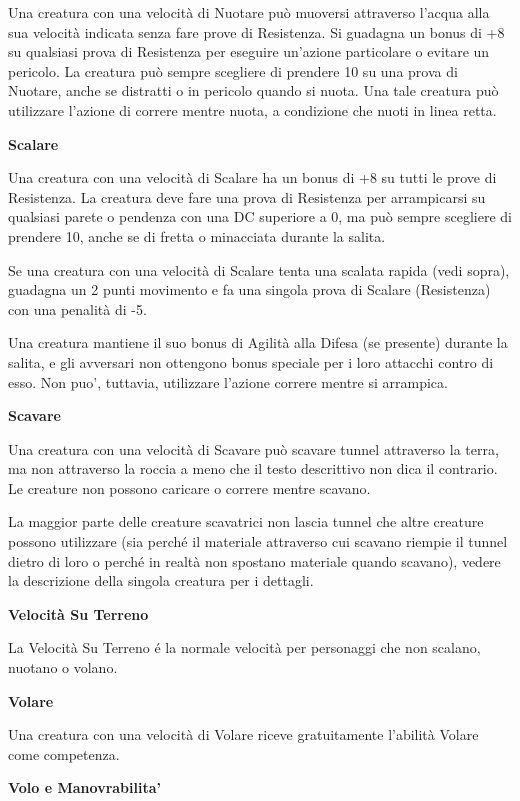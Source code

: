\documentclass[a4paper,11pt,twoside,openany]{book}
\begin{document}
{Una creatura con una velocità di Nuotare può muoversi attraverso l'acqua alla sua velocità indicata senza fare prove di Resistenza. Si guadagna un bonus di +8 su qualsiasi prova di Resistenza per eseguire un'azione particolare o evitare un pericolo. La creatura può sempre scegliere di prendere 10 su una prova di Nuotare, anche se distratti o in pericolo quando si nuota. Una tale creatura può utilizzare l'azione di correre mentre nuota, a condizione che nuoti in linea retta.

\textbf{Scalare}

Una creatura con una velocità di Scalare ha un bonus di +8 su tutti le prove di Resistenza. La creatura deve fare una prova di Resistenza per arrampicarsi su qualsiasi parete o pendenza con una DC superiore a 0, ma può sempre scegliere di prendere 10, anche se di fretta o minacciata durante la salita.

Se una creatura con una velocità di Scalare tenta una scalata rapida (vedi sopra), guadagna un 2 punti movimento e fa una singola prova di Scalare (Resistenza) con una penalità di -5. 

Una creatura mantiene il suo bonus di Agilità alla Difesa (se presente) durante la salita, e gli avversari non ottengono bonus speciale per i loro attacchi contro di esso. Non puo', tuttavia, utilizzare l'azione correre mentre si arrampica.

\textbf{Scavare}

Una creatura con una velocità di Scavare può scavare tunnel attraverso la terra, ma non attraverso la roccia a meno che il testo descrittivo non dica il contrario. Le creature non possono caricare o correre mentre scavano.

La maggior parte delle creature scavatrici non lascia tunnel che altre creature possono utilizzare (sia perché il materiale attraverso cui scavano riempie il tunnel dietro di loro o perché in realtà non spostano materiale quando scavano), vedere la descrizione della singola creatura per i dettagli.

\textbf{Velocità Su Terreno}

La Velocità Su Terreno é la normale velocità per personaggi che non scalano, nuotano o volano.

\textbf{Volare}

Una creatura con una velocità di Volare riceve gratuitamente l'abilità Volare come competenza.

\textbf{Volo e Manovrabilita'}

}
\end{document}
